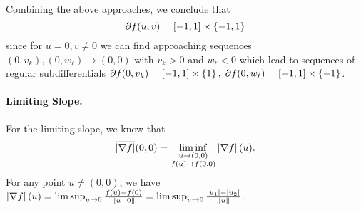 \documentclass[10pt]{article}
\begin{document}
Combining the above approaches, we conclude that
\[
    \partial f(u, v) = [-1, 1] \times \left\{ -1, 1 \right\}
\]
since for $u = 0, v \neq 0$ we can find approaching sequences $(0, v_k), (0,
w_{\ell}) \to (0, 0)$ with $v_k > 0$ and $w_{\ell} < 0$ which lead to sequences
of regular subdifferentials $\partial f(0, v_k) = [-1, 1] \times \left\{ 1 \right\}, \;
\partial f(0, w_{\ell}) = [-1, 1] \times \left\{ -1 \right\}$.


\paragraph{Limiting Slope.}
For the limiting slope, we know that
\[
    \overline{\left| \nabla f \right|}(0, 0) = \liminf_{\substack{u \to (0, 0) \\ f(u)
    \to f(0, 0)}} \left| \nabla f \right|(u).
\]
For any point $u \neq (0, 0)$, we have $\left| \nabla f \right|(u) =
\limsup_{u \to 0} \frac{f(u) - f(0)}{\left \| u - 0 \right \|} = \limsup_{u \to 0}
\frac{\left| u_1 \right| - \left| u_2 \right|}{\left \| u \right \|}$.
\end{document}
